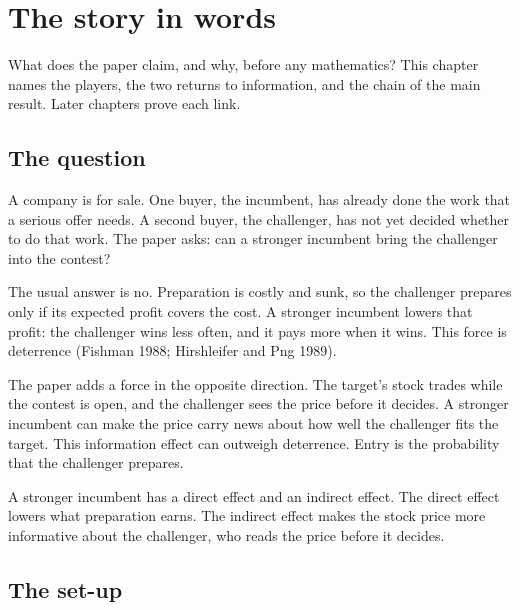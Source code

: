 \chapter{The story in words}\label{ch:story}

\begin{chapterplan}
What does the paper claim, and why, before any mathematics? This chapter names the players, the two returns to
information, and the chain of the main result. Later chapters prove each link.
\end{chapterplan}

\section{The question}\label{sec:story-question}

A company is for sale. One buyer, the incumbent, has already done the work that a serious offer needs. A second
buyer, the challenger, has not yet decided whether to do that work. The paper asks: can a stronger incumbent bring
the challenger into the contest?

The usual answer is no. Preparation is costly and sunk, so the challenger prepares only if its expected profit
covers the cost. A stronger incumbent lowers that profit: the challenger wins less often, and it pays more when it
wins. This force is deterrence (Fishman 1988; Hirshleifer and Png 1989).

The paper adds a force in the opposite direction. The target's stock trades while the contest is open, and the
challenger sees the price before it decides. A stronger incumbent can make the price carry news about how well the
challenger fits the target. This information effect can outweigh deterrence. Entry is the probability that the
challenger prepares.

\begin{keyidea}
A stronger incumbent has a direct effect and an indirect effect. The direct effect lowers what preparation earns.
The indirect effect makes the stock price more informative about the challenger, who reads the price before it
decides.
\end{keyidea}

\section{The set-up}\label{sec:story-setting}

